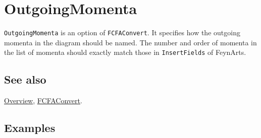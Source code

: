 \documentclass[../FeynCalcManual.tex]{subfiles}
\begin{document}
\hypertarget{outgoingmomenta}{%
\section{OutgoingMomenta}\label{outgoingmomenta}}

\texttt{OutgoingMomenta} is an option of \texttt{FCFAConvert}. It
specifies how the outgoing momenta in the diagram should be named. The
number and order of momenta in the list of momenta should exactly match
those in \texttt{InsertFields} of FeynArts.

\subsection{See also}

\hyperlink{toc}{Overview}, \hyperlink{fcfaconvert}{FCFAConvert}.

\subsection{Examples}
\end{document}
